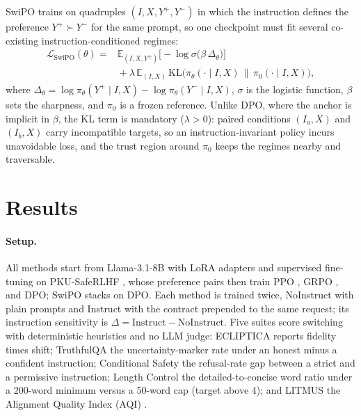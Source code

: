 \documentclass[letterpaper]{article} %
\begin{document}
SwiPO trains on quadruples $(I,X,Y^+,Y^-)$ in which the instruction defines the preference $Y^+\succ Y^-$ for the same prompt, so one checkpoint must fit several co-existing instruction-conditioned regimes:
\begin{align}
\mathcal{L}_{\mathrm{SwiPO}}(\theta) ={}& \mathbb{E}_{(I,X,Y^{\pm})}\big[-\log\sigma\big(\beta\,\Delta_\theta\big)\big] \nonumber\\
&{}+ \lambda\,\mathbb{E}_{(I,X)}\,\mathrm{KL}\big(\pi_\theta(\cdot\mid I,X)\,\big\|\,\pi_0(\cdot\mid I,X)\big),
\end{align}
where $\Delta_\theta=\log\pi_\theta(Y^+\mid I,X)-\log\pi_\theta(Y^-\mid I,X)$, $\sigma$ is the logistic function, $\beta$ sets the sharpness, and $\pi_0$ is a frozen reference. Unlike DPO, where the anchor is implicit in $\beta$, the KL term is mandatory ($\lambda>0$): paired conditions $(I_a,X)$ and $(I_b,X)$ carry incompatible targets, so an instruction-invariant policy incurs unavoidable loss, and the trust region around $\pi_0$ keeps the regimes nearby and traversable.

\section{Results}

\paragraph{Setup.}
All methods start from Llama-3.1-8B \cite{dubey2024llama} with LoRA adapters and supervised fine-tuning on PKU-SafeRLHF \cite{ji2024pku}, whose preference pairs then train PPO \cite{schulman2017proximal}, GRPO \cite{shao2024deepseekmath}, and DPO; SwiPO stacks on DPO. Each method is trained twice, NoInstruct with plain prompts and Instruct with the contract prepended to the same request; its instruction sensitivity is $\Delta=\text{Instruct}-\text{NoInstruct}$. Five suites score switching with deterministic heuristics and no LLM judge: ECLIPTICA reports fidelity times shift; TruthfulQA \cite{lin2022truthfulqa} the uncertainty-marker rate under an honest minus a confident instruction; Conditional Safety the refusal-rate gap between a strict and a permissive instruction; Length Control the detailed-to-concise word ratio under a 200-word minimum versus a 50-word cap (target above 4); and LITMUS the Alignment Quality Index (AQI) \cite{borah2025aqi}.
\end{document}
